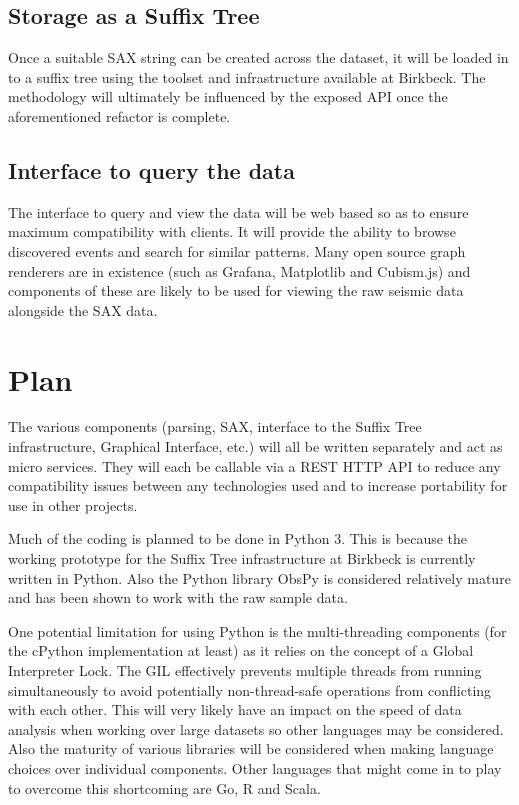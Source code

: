 \documentclass[11pt, a4paper]{scrartcl}
\begin{document}
\subsection{Storage as a Suffix Tree}
	Once a suitable SAX string can be created across the dataset, it will be loaded in to a suffix tree using the toolset and infrastructure available at Birkbeck.  The methodology will ultimately be influenced by the exposed API once the aforementioned refactor is complete.

\subsection{Interface to query the data}
	The interface to query and view the data will be web based so as to ensure maximum compatibility with clients.  It will provide the ability to browse discovered events and search for similar patterns.  Many open source graph renderers are in existence (such as Grafana, Matplotlib and Cubism.js) and components of these are likely to be used for viewing the raw seismic data alongside the SAX data.

\section{Plan}
	The various components (parsing, SAX, interface to the Suffix Tree infrastructure, Graphical Interface, etc.) will all be written separately and act as micro services.  They will each be callable via a REST HTTP API to reduce any compatibility issues between any technologies used and to increase portability for use in other projects.

	Much of the coding is planned to be done in Python 3.  This is because the working prototype for the Suffix Tree infrastructure at Birkbeck is currently written in Python.  Also the Python library ObsPy is considered relatively mature and has been shown to work with the raw sample data.
	
	One potential limitation for using Python is the multi-threading components (for the cPython implementation at least) as it relies on the concept of a Global Interpreter Lock.  The GIL effectively prevents multiple threads from running simultaneously to avoid potentially non-thread-safe operations from conflicting with each other.  This will very likely have an impact on the speed of data analysis when working over large datasets so other languages may be considered.  Also the maturity of various libraries will be considered when making language choices over individual components.  Other languages that might come in to play to overcome this shortcoming are Go, R and Scala.
	
\end{document}
